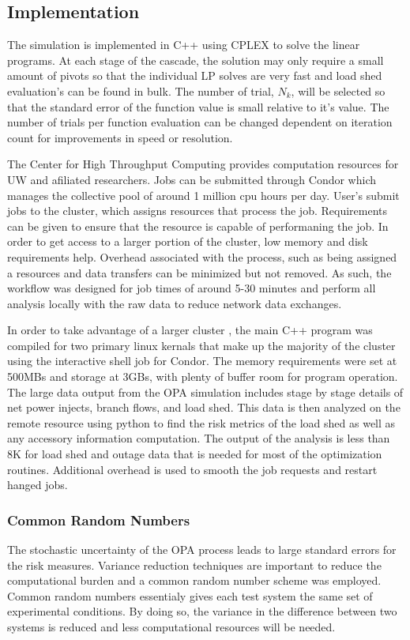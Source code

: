 \subsection*{Implementation}
The simulation is implemented in C++ using CPLEX to solve the linear programs.  At each stage of the cascade, the solution may only require a small amount of pivots so that the individual LP solves are very fast and load shed evaluation's can be found in bulk.  The number of trial, $N_k$, will be selected so that the standard error of the function value is small relative to it's value.  The number of trials per function evaluation can be changed dependent on iteration count for improvements in speed or resolution.

The Center for High Throughput Computing provides computation resources for UW and afiliated researchers.  Jobs can be submitted through Condor \cite{beowulfbook-condor} which manages the collective pool of around 1 million cpu hours per day.  User's submit jobs to the cluster, which assigns resources that process the job.  Requirements can be given to ensure that the resource is capable of performaning the job.  In order to get access to a larger portion of the cluster, low memory and disk requirements help.  Overhead associated with the process, such as being assigned a resources and data transfers can be minimized but not removed. As such, the workflow was designed for job times of around 5-30 minutes and perform all analysis locally with the raw data to reduce network data exchanges.

In order to take advantage of a larger cluster \cite{condor_flock}, the main C++ program was compiled for two primary linux kernals that make up the majority of the cluster using the interactive shell job for Condor.  The memory requirements were set at 500MBs and storage at 3GBs, with plenty of buffer room for program operation.  The large data output from the OPA simulation includes stage by stage details of net power injects, branch flows, and load shed.  This data is then analyzed on the remote resource using python to find the risk metrics of the load shed as well as any accessory information computation.  The output of the analysis is less than 8K for load shed and outage data that is needed for most of the optimization routines.  Additional overhead is used to smooth the job requests and restart hanged jobs. 

\subsubsection*{Common Random Numbers}
The stochastic uncertainty of the OPA process leads to large standard errors for the risk measures.  Variance reduction techniques are important to reduce the computational burden and a common random number scheme was employed.  Common random numbers essentialy gives each test system the same set of experimental conditions.  By doing so, the variance in the difference between two systems is reduced and less computational resources will be needed. \cite{law_2007}

